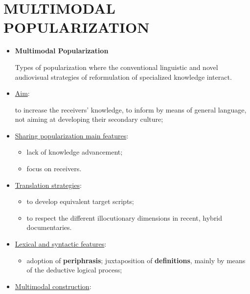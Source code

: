 \section{MULTIMODAL POPULARIZATION}

\begin{itemize}

\item

\begin{defn}{\textbf{Multimodal Popularization}}

Types of popularization where the conventional linguistic and novel audiovisual strategies of reformulation of specialized knowledge interact.

\end{defn}

\item\underline{Aim}:

to increase the receivers’ knowledge, to inform by means of general language, not aiming at developing their secondary culture;
 
\item\underline{Sharing popularization main features}:

\begin{itemize}
\item lack of knowledge advancement;
\item focus on receivers.
\end{itemize}

\item\underline{Translation strategies}:

\begin{itemize}
\item to develop equivalent target scripts;
\item to respect the different illocutionary dimensions in recent, hybrid documentaries.
\end{itemize}

\item\underline{Lexical and syntactic features}:

\begin{itemize}
\item adoption of \textbf{periphrasis}; juxtaposition of \textbf{definitions}, mainly by means of the deductive logical process;
\end{itemize}

\item\underline{Multimodal construction}:

\begin{itemize}


\end{itemize}
\end{itemize}
